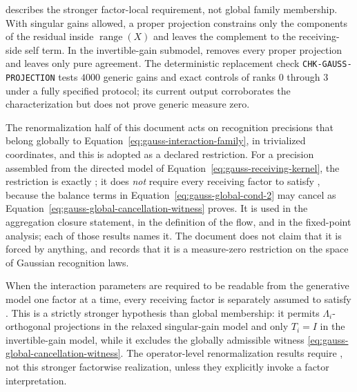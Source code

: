  describes the stronger factor-local requirement, not global family membership. With singular gains allowed, a proper projection constrains only the components of the residual inside \(\operatorname{range}(X)\) and leaves the complement to the receiving-side self term. In the invertible-gain submodel,  removes every proper projection and leaves only pure agreement. The deterministic replacement check \texttt{CHK-GAUSS-PROJECTION} tests $4000$ generic gains and exact controls of ranks $0$ through $3$ under a fully specified protocol; its current output corroborates the characterization but does not prove generic measure zero. 

The renormalization half of this document acts on recognition precisions that belong globally to Equation~\eqref{eq:gauss-interaction-family}, in trivialized coordinates, and this is adopted as a declared restriction. For a precision assembled from the directed model of Equation~\eqref{eq:gauss-receiving-kernel}, the restriction is exactly ; it does \emph{not} require every receiving factor to satisfy , because the balance terms in Equation~\eqref{eq:gauss-global-cond-2} may cancel as Equation~\eqref{eq:gauss-global-cancellation-witness} proves. It is used in the aggregation closure statement, in the definition of the flow, and in the fixed-point analysis; each of those results names it. The document does not claim that it is forced by anything, and  records that it is a measure-zero restriction on the space of Gaussian recognition laws. 

When the interaction parameters are required to be readable from the generative model one factor at a time, every receiving factor is separately assumed to satisfy . This is a strictly stronger hypothesis than global membership: it permits \(\Lambda_i\)-orthogonal projections in the relaxed singular-gain model and only \(T_i=I\) in the invertible-gain model, while it excludes the globally admissible witness \eqref{eq:gauss-global-cancellation-witness}. The operator-level renormalization results require , not this stronger factorwise realization, unless they explicitly invoke a factor interpretation. 

